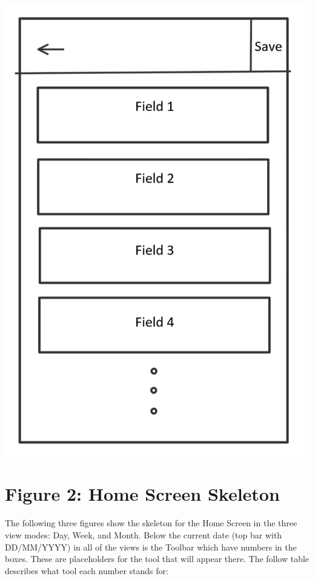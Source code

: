 \documentclass{scrreprt}
\begin{document}
\begin{center}
\includegraphics{eventform.PNG}
\end{center}

\section{Figure 2: Home Screen Skeleton}

The following three figures show the skeleton for the Home Screen in the three view modes: Day, Week, and Month.  Below the current date (top bar with DD/MM/YYYY) in all of the views is the Toolbar which have numbers in the boxes.  These are placeholders for the tool that will appear there.  The follow table describes what tool each number stands for:\\
\end{document}
